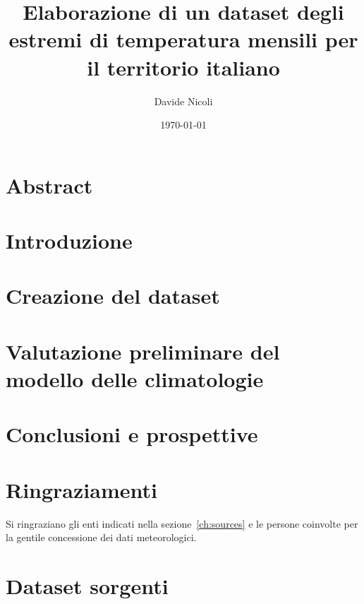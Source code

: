 \documentclass[a4paper, 12pt]{report}
\title{
  {Elaborazione di un dataset degli estremi di temperatura mensili per il territorio italiano}
}
\author{Davide Nicoli}
\date{\today}
\begin{document}



\chapter*{Abstract}


\tableofcontents


\chapter{Introduzione}\label{ch:intro}


\chapter{Creazione del dataset}


\chapter{Valutazione preliminare del modello delle climatologie}


\chapter{Conclusioni e prospettive}\label{ch:conclusioni}


\chapter*{Ringraziamenti}
Si ringraziano gli enti indicati nella sezione~\ref{ch:sources} e le persone coinvolte per la gentile concessione dei dati meteorologici.

\appendix
\chapter{Dataset sorgenti}


\clearpage
\printbibliography{}
\end{document}
